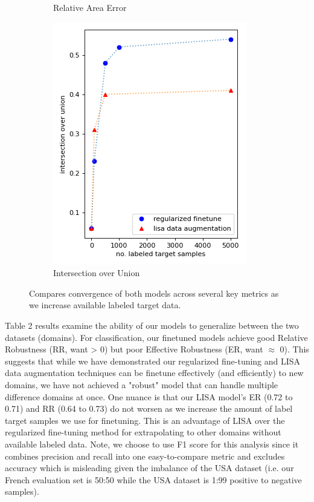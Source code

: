 \documentclass[10pt,twocolumn,letterpaper]{article}
\begin{document}
\begin{figure}[htp]
\begin{subfigure}{.3\textwidth}
    \caption{Relative Area Error}
\end{subfigure}
\begin{subfigure}{.3\textwidth}
    \centering
    \includegraphics[width=.95\linewidth]{y_iou.png}  
    \caption{Intersection over Union}
\end{subfigure}
\caption{Compares convergence of both models across several key metrics as we increase available labeled target data.}
\label{fig:convergence}
\end{figure}


Table 2 results examine the ability of our models to generalize between the two datasets (domains). For classification, our finetuned models achieve good Relative Robustness (RR, want > 0)  but poor Effective Robustness (ER, want $\approx$ 0). This suggests that while we have demonstrated our regularized fine-tuning and LISA data augmentation techniques can be finetune effectively (and efficiently) to new domains, we have not achieved a "robust" model that can handle multiple difference domains at once. One nuance is that our LISA model's ER (0.72 to 0.71) and RR (0.64 to 0.73) do not worsen as we increase the amount of label target samples we use for finetuning. This is an advantage of LISA over the regularized fine-tuning method for extrapolating to other domains without available labeled data. Note, we choose to use F1 score for this analysis since it combines precision and recall into one easy-to-compare metric and excludes accuracy which is misleading given the imbalance of the USA dataset (i.e. our French evaluation set is 50:50 while the USA dataset is 1:99 positive to negative samples). 
\end{document}

